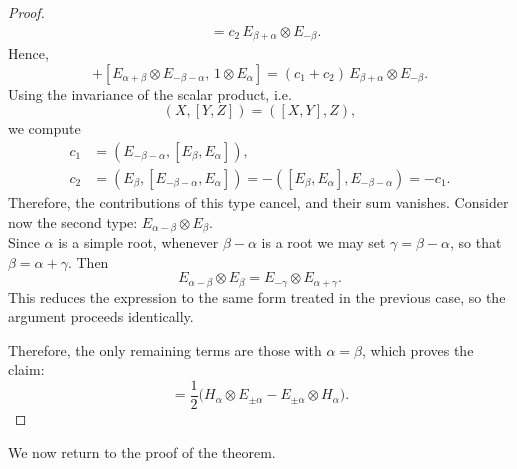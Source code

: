 \begin{proof}
\begin{align}
        [E_{\alpha + \beta} \otimes E_{-\beta - \alpha},\, 1 \otimes E_{\alpha}] &= c_2 \, E_{\beta + \alpha} \otimes E_{-\beta}.
    \end{align}
    Hence,
    \begin{equation}
        [E_\beta \otimes E_{-\beta},\, E_\alpha \otimes 1] 
        + [E_{\alpha + \beta} \otimes E_{-\beta - \alpha},\, 1 \otimes E_{\alpha}]
        = (c_1 + c_2)\, E_{\beta + \alpha} \otimes E_{-\beta}.
    \end{equation}
   Using the invariance of the scalar product, i.e.
    \begin{equation}
        (X,[Y,Z]) = ([X,Y],Z),
    \end{equation}
    we compute
    \begin{align}
        c_1 &= (E_{-\beta-\alpha},[E_\beta,E_\alpha]), \\
        c_2 &= (E_\beta,[E_{-\beta-\alpha},E_\alpha])
            = -([E_\beta,E_\alpha],E_{-\beta-\alpha})
            = -c_1.
    \end{align}
    Therefore, the contributions of this type cancel, and their sum vanishes.
    Consider now the second type: $ E_{\alpha - \beta} \otimes E_\beta $.\\
    Since $\alpha$ is a simple root, whenever $\beta - \alpha$ is a root we may set $\gamma = \beta - \alpha$, so that $\beta = \alpha + \gamma$.
    Then
    \begin{equation}
        E_{\alpha - \beta} \otimes E_\beta = E_{-\gamma} \otimes E_{\alpha + \gamma}.
    \end{equation}
    This reduces the expression to the same form treated in the previous case, so the argument proceeds identically.

    Therefore, the only remaining terms are those with $\alpha = \beta$, which proves the claim:
    \begin{equation}
        [r_{12},\, E_{\pm \alpha} \otimes 1 + 1 \otimes E_{\pm \alpha}]
        = \frac{1}{2}\bigl(H_{\alpha} \otimes E_{\pm \alpha} - E_{\pm \alpha} \otimes H_{\alpha}\bigr).
    \end{equation}
\end{proof}
We now return to the proof of the theorem.
